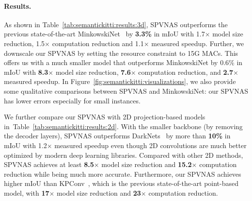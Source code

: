 \documentclass[runningheads]{llncs}
\newcommand{\fig}[1]{Figure~\ref{#1}}
\newcommand{\tab}[1]{Table~\ref{#1}}
\def\modelshort{SPVNAS\xspace}
\begin{document}
\paragraph{Results.}

As shown in \tab{tab:semantickitti:results:3d}, \modelshort outperforms the previous state-of-the-art MinkowskiNet~\cite{choy20194d} by \textbf{3.3\%} in mIoU with 1.7$\times$ model size reduction, 1.5$\times$ computation reduction and 1.1$\times$ measured speedup. Further, we downscale our \modelshort by setting the resource constraint to 15G MACs. This offers us with a much smaller model that outperforms MinkowskiNet by 0.6\% in mIoU with \textbf{8.3$\times$} model size reduction, \textbf{7.6$\times$} computation reduction, and \textbf{2.7$\times$} measured speedup. In \fig{fig:semantickitti:visualizations}, we also provide some qualitative comparisons between \modelshort and MinkowskiNet: our \modelshort has lower errors especially for small instances.

We further compare our \modelshort with 2D projection-based models in~\tab{tab:semantickitti:results:2d}. With the smaller backbone (by removing the decoder layers), \modelshort outperforms DarkNets~\cite{behley2019semantickitti} by more than \textbf{10\%} in mIoU with 1.2$\times$ measured speedup even though 2D convolutions are much better optimized by modern deep learning libraries. Compared with other 2D methods, \modelshort achieves at least \textbf{8.5}$\times$ model size reduction and \textbf{15.2}$\times$ computation reduction while being much more accurate. Furthermore, our \modelshort achieves higher mIoU than KPConv~\cite{thomas2019kpconv}, which is the previous state-of-the-art point-based model, with \textbf{17$\times$} model size reduction and \textbf{23$\times$} computation reduction.
\end{document}
